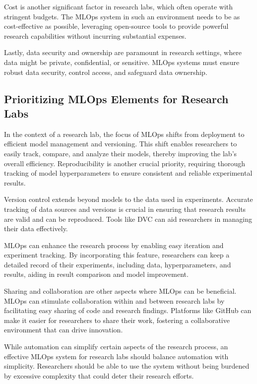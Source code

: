 Cost is another significant factor in research labs, which often operate with stringent budgets. The MLOps system in such an environment needs to be as cost-effective as possible, leveraging open-source tools to provide powerful research capabilities without incurring substantial expenses.

Lastly, data security and ownership are paramount in research settings, where data might be private, confidential, or sensitive. MLOps systems must ensure robust data security, control access, and safeguard data ownership.

\subsection{Prioritizing MLOps Elements for Research Labs
 \label{prioritizing-mlops}}

In the context of a research lab, the focus of MLOps shifts from deployment to efficient model management and versioning. This shift enables researchers to easily track, compare, and analyze their models, thereby improving the lab's overall efficiency. Reproducibility is another crucial priority, requiring thorough tracking of model hyperparameters to ensure consistent and reliable experimental results.

Version control extends beyond models to the data used in experiments. Accurate tracking of data sources and versions is crucial in ensuring that research results are valid and can be reproduced. Tools like DVC can aid researchers in managing their data effectively.

MLOps can enhance the research process by enabling easy iteration and experiment tracking. By incorporating this feature, researchers can keep a detailed record of their experiments, including data, hyperparameters, and results, aiding in result comparison and model improvement.

Sharing and collaboration are other aspects where MLOps can be beneficial. MLOps can stimulate collaboration within and between research labs by facilitating easy sharing of code and research findings. Platforms like GitHub can make it easier for researchers to share their work, fostering a collaborative environment that can drive innovation.

While automation can simplify certain aspects of the research process, an effective MLOps system for research labs should balance automation with simplicity. Researchers should be able to use the system without being burdened by excessive complexity that could deter their research efforts.


